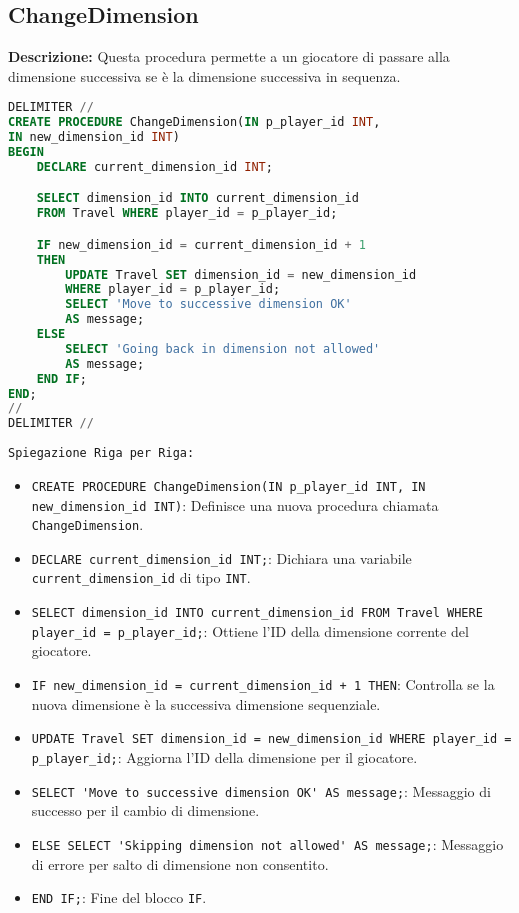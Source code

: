 \documentclass{article}
\begin{document}
\subsection*{ChangeDimension}

\textbf{Descrizione:} Questa procedura permette a un giocatore di passare alla dimensione successiva se è la dimensione successiva in sequenza.

\begin{lstlisting}[language=SQL]
DELIMITER //
CREATE PROCEDURE ChangeDimension(IN p_player_id INT,
IN new_dimension_id INT)
BEGIN
    DECLARE current_dimension_id INT;

    SELECT dimension_id INTO current_dimension_id
    FROM Travel WHERE player_id = p_player_id;

    IF new_dimension_id = current_dimension_id + 1
    THEN
        UPDATE Travel SET dimension_id = new_dimension_id
        WHERE player_id = p_player_id;
        SELECT 'Move to successive dimension OK'
        AS message;
    ELSE
        SELECT 'Going back in dimension not allowed'
        AS message;
    END IF;
END;
//
DELIMITER //
\end{lstlisting}

\texttt{Spiegazione Riga per Riga:}
\begin{itemize}
    \item \lstinline|CREATE PROCEDURE ChangeDimension(IN p_player_id INT, IN new_dimension_id INT)|: Definisce una nuova procedura chiamata \lstinline|ChangeDimension|.
    \item \lstinline|DECLARE current_dimension_id INT;|: Dichiara una variabile \lstinline|current_dimension_id| di tipo \lstinline|INT|.
    \item \lstinline|SELECT dimension_id INTO current_dimension_id FROM Travel WHERE player_id = p_player_id;|: Ottiene l'ID della dimensione corrente del giocatore.
    \item \lstinline|IF new_dimension_id = current_dimension_id + 1 THEN|: Controlla se la nuova dimensione è la successiva dimensione sequenziale.
    \item \lstinline|UPDATE Travel SET dimension_id = new_dimension_id WHERE player_id = p_player_id;|: Aggiorna l'ID della dimensione per il giocatore.
    \item \lstinline|SELECT 'Move to successive dimension OK' AS message;|: Messaggio di successo per il cambio di dimensione.
    \item \lstinline|ELSE SELECT 'Skipping dimension not allowed' AS message;|: Messaggio di errore per salto di dimensione non consentito.
    \item \lstinline|END IF;|: Fine del blocco \lstinline|IF|.
\end{itemize}
\end{document}
